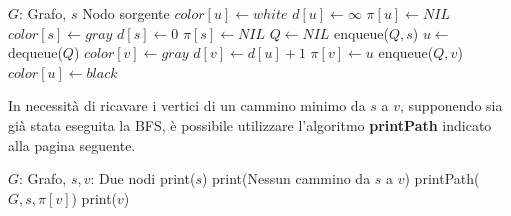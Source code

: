 \begin{algorithm}[h]
	\caption{BFS(G,s)}
	\begin{algorithmic}[i]
		\Require $G$: Grafo, $s$ Nodo sorgente
		 
		\State $color[u]\gets white$ 
		\State $d[u]\gets \infty$ 
		\State $\pi[u]\gets NIL$ 
		\EndFor
		\State
		\State $color[s]\gets gray$ 
		\State $d[s]\gets 0$ 
		\State $\pi[s]\gets NIL$ 
		\State $Q\gets NIL$ 
		\State enqueue($Q,s$)
		\State
		 
		\State $u\gets$ dequeue($Q$) 
		 
		 
		\State $color[v]\gets gray$ 
		\State $d[v]\gets d[u]+1$ 
		\State $\pi[v]\gets u$ 
		\State enqueue($Q,v$) 
		\EndIf
		\EndFor
		\State $color[u]\gets black$ 
		\EndWhile
	\end{algorithmic}
\end{algorithm}

\noindent In necessità di ricavare i vertici di un cammino minimo da $s$ a $v$, supponendo sia già stata eseguita la BFS, è possibile utilizzare l'algoritmo \textbf{printPath} indicato alla pagina seguente.
\begin{algorithm}[h]
	\caption{printPath(G,s,v)}
	\begin{algorithmic}[i]
		\Require $G$: Grafo, $s,v$: Due nodi
		\State print($s$)
		\State print(Nessun cammino da $s$ a $v$)
		\Else  
		\State printPath($G, s, \pi[v]$)
		\State print($v$)
		\EndIf
	\end{algorithmic}
\end{algorithm}

